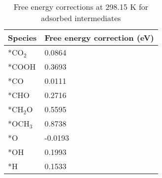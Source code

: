 \begin{table}[h]
  \centering
  {\fontsize{10}{12}\selectfont
  \begin{tabular}{ll}
    \hline
    \textbf{Species}  & \textbf{Free energy correction (eV)} \\
    \hline
    *CO$_2$  &  0.0864                      \\
    *COOH    &  0.3693                      \\
    *CO      &  0.0111                      \\
    *CHO     &  0.2716                      \\
    *CH$_2$O &  0.5595                      \\
    *OCH$_3$ &  0.8738                      \\
    *O       & -0.0193                      \\
    *OH      &  0.1993                      \\
    *H       &  0.1533                      \\
    \hline
  \end{tabular}
  }
  \caption{Free energy corrections at 298.15 K for adsorbed intermediates}
  \label{si_table3:ads_e_correction}
\end{table}



